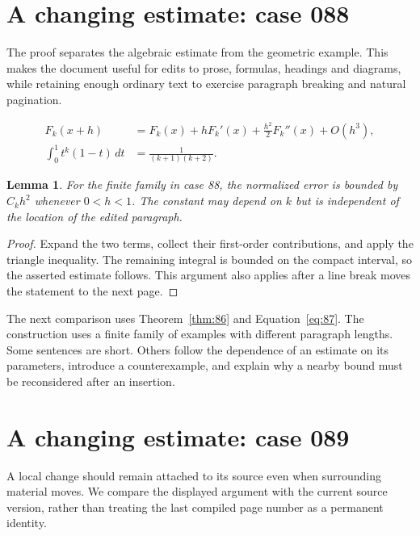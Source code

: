 \documentclass[a4paper,10pt]{article}
\newtheorem{lemma}[theorem]{Lemma}
\begin{document}
\lipsum[8]

\section{A changing estimate: case 088}\label{unit:87}
The proof separates the algebraic estimate from the geometric example. This makes the document useful for edits to prose, formulas, headings and diagrams, while retaining enough ordinary text to exercise paragraph breaking and natural pagination.

\lipsum[22-23]
\begin{align}\label{eq:87}
 F_k(x+h)&=F_k(x)+hF_k'(x)+\frac{h^2}{2}F_k''(x)+O(h^3),\\
 \int_0^1 t^k(1-t)\,dt&=\frac{1}{(k+1)(k+2)}.
\end{align}
\begin{lemma}\label{thm:87}
For the finite family in case 88, the normalized error is bounded by $C_k h^2$ whenever $0<h<1$. The constant may depend on $k$ but is independent of the location of the edited paragraph.
\end{lemma}
\begin{proof}
Expand the two terms, collect their first-order contributions, and apply the
triangle inequality. The remaining integral is bounded on the compact interval,
so the asserted estimate follows. This argument also applies after a line break
moves the statement to the next page.
\end{proof}
\begin{center}
\end{center}
The next comparison uses Theorem~\ref{thm:86} and Equation~\ref{eq:87}. The construction uses a finite family of examples with different paragraph lengths. Some sentences are short. Others follow the dependence of an estimate on its parameters, introduce a counterexample, and explain why a nearby bound must be reconsidered after an insertion.

\lipsum[13]

\section{A changing estimate: case 089}\label{unit:88}
A local change should remain attached to its source even when surrounding material moves. We compare the displayed argument with the current source version, rather than treating the last compiled page number as a permanent identity.
\end{document}
